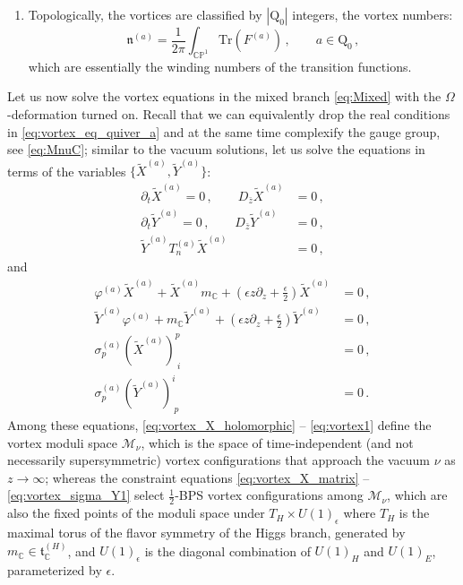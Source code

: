 \documentclass[12pt,a4paper]{article}
\newcommand{\nn}{\mathfrak{n}}
\renewcommand{\(}{\left(}
\renewcommand{\)}{\right)}
\newcommand{\eps}{\epsilon}
\renewcommand{\(}{\left(}
\renewcommand{\)}{\right)}
\begin{document}
\begin{enumerate}
\item Topologically, the vortices are classified by $|\mathrm{Q}_0|$ integers, the vortex numbers:
\begin{equation}\label{eq:na}
\nn^{(a)}=\frac{1}{2\pi}\int_{\mathbb{CP}^1} \mathrm{Tr}(F^{(a)})\,,\qquad a\in \mathrm{Q}_0\,,
\end{equation}
which are essentially the winding numbers of the transition functions. 
\end{enumerate}

\medskip

Let us now solve the vortex equations in the mixed branch \eqref{eq:Mixed} with the $\Omega$-deformation turned on.
Recall that we can equivalently drop the real conditions in \eqref{eq:vortex_eq_quiver_a} and at the same time complexify the gauge group, see \eqref{eq:MnuC}; similar to the vacuum solutions, let us solve the equations in terms of the  variables $\{\tilde{X}^{(a)},\tilde{Y}^{(a)}\}$:
\begin{align}
\partial_t\tilde{X}^{(a)}=0\,, \qquad D_{\bar{z}}\tilde{X}^{(a)}&=0\,,\label{eq:vortex_X_holomorphic}\\
\partial_t\tilde{Y}^{(a)}=0\,, \qquad
D_{\bar{z}}\tilde{Y}^{(a)}&=0\,, \label{eq:vortex_Y_holomorphic} \\
\tilde{Y}^{(a)} T^{(a)}_n \tilde{X}^{(a)}&=0\,,\label{eq:vortex1}
\end{align}
and 
\begin{align}
\varphi^{(a)}\tilde{X}^{(a)}+\tilde{X}^{(a)}m_{\mathbb{C}}+(\epsilon z\partial_z+\frac{\eps}{2})\tilde{X}^{(a)}&=0\,,\label{eq:vortex_X_matrix}\\
\tilde{Y}^{(a)}\varphi^{(a)}+m_{\mathbb{C}}\tilde{Y}^{(a)}+(\epsilon z\partial_z+\frac{\eps}{2})\tilde{Y}^{(a)}&=0\,,\label{eq:vortex_Y_matrix}\\
\sigma^{(a)}_p(\tilde{X}^{(a)})^p_{\ i}&=0\,,\label{eq:vortex_sigma_X1}\\
\sigma^{(a)}_p(\tilde{Y}^{(a)})^i_{\ p}&=0\,.\label{eq:vortex_sigma_Y1}
\end{align}
Among these equations, 
\eqref{eq:vortex_X_holomorphic} -- \eqref{eq:vortex1} define the vortex moduli space $\mathcal{M}_{\nu}$, which is the space of time-independent (and not necessarily supersymmetric) vortex configurations that approach the vacuum $\nu$ as $z\rightarrow \infty$; 
whereas the constraint equations \eqref{eq:vortex_X_matrix} --  \eqref{eq:vortex_sigma_Y1} select $\frac{1}{2}$-BPS  vortex configurations among $\mathcal{M}_{\nu}$, which are also the fixed points of the moduli space under $T_{H}\times U(1)_{\epsilon}$ where $T_{H}$ is the maximal torus of the flavor symmetry of the Higgs branch, generated by $m_{\mathbb{C}}\in\mathfrak{t}^{(H)}_{\mathbb{C}} $, and $U(1)_{\epsilon}$ is the diagonal combination of $U(1)_H$ and $U(1)_E$, parameterized by $\epsilon$.
\end{document}
